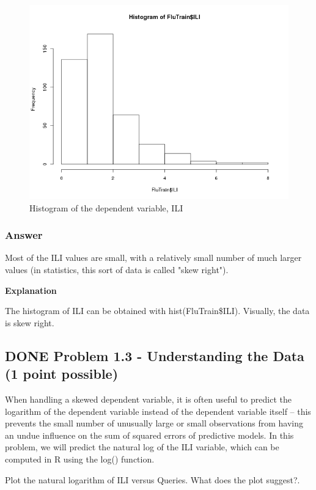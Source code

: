 \documentclass[letterpaper, 9pt, onecolumn, twoside, technote, final]{IEEEtran}
\begin{document}
\begin{figure}[htb]
\centering
\includegraphics[width=.9\linewidth]{../graphs/ExploratoryILI.png}
\caption{\label{fig:ExploratoryILI}Histogram of the dependent variable, ILI}
\end{figure}

\subsubsection{Answer}
\label{sec-3-2-1}

Most of the ILI values are small, with a relatively small number of
much larger values (in statistics, this sort of data is called "skew
right").

\textbf{Explanation}

The histogram of ILI can be obtained with
hist(FluTrain\$ILI). Visually, the data is skew right.

\subsection{{\bfseries\sffamily DONE} Problem 1.3 - Understanding the Data (1 point possible)}
\label{sec-3-3}
When handling a skewed dependent variable, it is often useful to
predict the logarithm of the dependent variable instead of the
dependent variable itself -- this prevents the small number of
unusually large or small observations from having an undue influence
on the sum of squared errors of predictive models. In this problem, we
will predict the natural log of the ILI variable, which can be
computed in R using the log() function.

Plot the natural logarithm of ILI versus Queries. What does the plot
suggest?.
\end{document}

